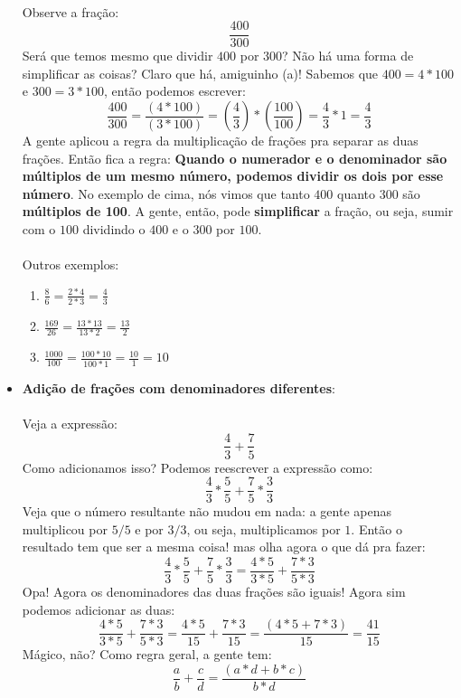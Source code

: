 \documentclass[11pt]{article}
\begin{document}
\begin{itemize}
	\paragraph{}
	Observe a fração:
	$$\frac{400}{300}$$
	Será que temos mesmo que dividir $400$ por $300$? Não há uma forma de 
	simplificar as coisas? Claro que há, amiguinho (a)! Sabemos que 
	$400 = 4*100$ e $300 = 3*100$, então podemos escrever:
	$$\frac{400}{300} = \frac{(4*100)}{(3*100)} = 
	(\frac{4}{3})*(\frac{100}{100}) = \frac{4}{3}*1 = \frac{4}{3}$$
	A gente aplicou a regra da multiplicação de frações pra separar as duas
	frações. Então fica a regra: \textbf{Quando o numerador e o denominador
	são múltiplos de um mesmo número, podemos dividir os dois por esse número}.
	No exemplo de cima, nós vimos que tanto $400$ quanto $300$ são 
	\textbf{múltiplos de 100}. A gente, então, pode \textbf{simplificar} 
	a fração, ou seja, sumir com o $100$ dividindo o $400$ e o $300$ por $100$.
	\paragraph{}
	Outros exemplos:
	\begin{enumerate}
		\item $\frac{8}{6} = \frac{2*4}{2*3} = \frac{4}{3}$
		\item $\frac{169}{26} = \frac{13*13}{13*2} = \frac{13}{2}$
		\item $\frac{1000}{100} = \frac{100*10}{100*1} = \frac{10}{1} = 10$
	\end{enumerate}
	\item \textbf{Adição de frações com denominadores diferentes}:
	\paragraph{}
	Veja a expressão:
	$$\frac{4}{3} + \frac{7}{5}$$
	Como adicionamos isso? Podemos reescrever a expressão como:
	$$\frac{4}{3}*\frac{5}{5} + \frac{7}{5}*\frac{3}{3}$$
	Veja que o número resultante não mudou em nada: a gente apenas multiplicou
	por $5/5$ e por $3/3$, ou seja, multiplicamos por $1$. Então o resultado
	tem que ser a mesma coisa! mas olha agora o que dá pra fazer:
	$$\frac{4}{3}*\frac{5}{5} + \frac{7}{5}*\frac{3}{3} = \frac{4*5}{3*5} + 
	\frac{7*3}{5*3}$$
	Opa! Agora os denominadores das duas frações são iguais! Agora sim podemos
	adicionar as duas:
	$$\frac{4*5}{3*5} + \frac{7*3}{5*3} = \frac{4*5}{15} + \frac{7*3}{15} =
	\frac{(4*5 + 7*3)}{15} = \frac{41}{15}$$
	Mágico, não? Como regra geral, a gente tem:
	$$\frac{a}{b} + \frac{c}{d} = \frac{(a*d + b*c)}{b*d}$$
\end{itemize}
\end{document}
